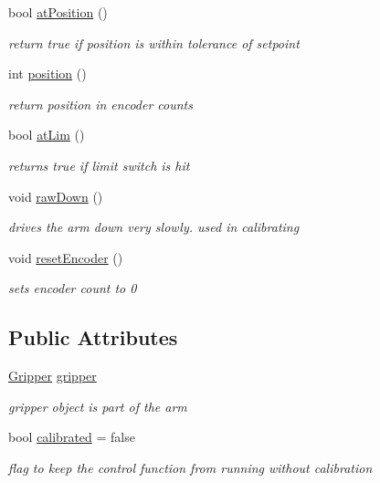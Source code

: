 \begin{DoxyCompactItemize}
bool \hyperlink{classArm_ae3c0195535b15f56f9027aea0ae5ec76}{at\-Position} ()
\begin{DoxyCompactList}\small\item\em return true if position is within tolerance of setpoint \end{DoxyCompactList}\item 
int \hyperlink{classArm_ab49756ee4bfdc5f573a78f29678bf1d8}{position} ()
\begin{DoxyCompactList}\small\item\em return position in encoder counts \end{DoxyCompactList}\item 
bool \hyperlink{classArm_a234397ff44a8ac5fda920d92b9b33237}{at\-Lim} ()
\begin{DoxyCompactList}\small\item\em returns true if limit switch is hit \end{DoxyCompactList}\item 
void \hyperlink{classArm_a90df7bcd3c225f6fc05ef2f77c773d2e}{raw\-Down} ()
\begin{DoxyCompactList}\small\item\em drives the arm down very slowly. used in calibrating \end{DoxyCompactList}\item 
void \hyperlink{classArm_afb44126b438f8dc00b0bf0720c84a737}{reset\-Encoder} ()
\begin{DoxyCompactList}\small\item\em sets encoder count to 0 \end{DoxyCompactList}\end{DoxyCompactItemize}
\subsection*{Public Attributes}
\begin{DoxyCompactItemize}
\item 
\hyperlink{classGripper}{Gripper} \hyperlink{classArm_a1f237e56fc1e76c2b63f1f59d847945d}{gripper}
\begin{DoxyCompactList}\small\item\em gripper object is part of the arm \end{DoxyCompactList}\item 
bool \hyperlink{classArm_a3f6c85e5a8feacd8870b653a8163d99f}{calibrated} = false
\begin{DoxyCompactList}\small\item\em flag to keep the control function from running without calibration \end{DoxyCompactList}\end{DoxyCompactItemize}
